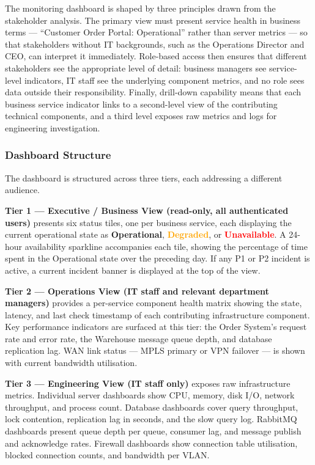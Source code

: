 The monitoring dashboard is shaped by three principles drawn from the stakeholder analysis. The primary view must present service health in business terms --- ``Customer Order Portal: Operational'' rather than server metrics --- so that stakeholders without IT backgrounds, such as the Operations Director and CEO, can interpret it immediately. Role-based access then ensures that different stakeholders see the appropriate level of detail: business managers see service-level indicators, IT staff see the underlying component metrics, and no role sees data outside their responsibility. Finally, drill-down capability means that each business service indicator links to a second-level view of the contributing technical components, and a third level exposes raw metrics and logs for engineering investigation.

\subsubsection{Dashboard Structure}

The dashboard is structured across three tiers, each addressing a different audience.

\textbf{Tier 1 --- Executive / Business View (read-only, all authenticated users)} presents six status tiles, one per business service, each displaying the current operational state as \textcolor{green!60!black}{\textbf{Operational}}, \textcolor{orange}{\textbf{Degraded}}, or \textcolor{red}{\textbf{Unavailable}}. A 24-hour availability sparkline accompanies each tile, showing the percentage of time spent in the Operational state over the preceding day. If any P1 or P2 incident is active, a current incident banner is displayed at the top of the view.

\textbf{Tier 2 --- Operations View (IT staff and relevant department managers)} provides a per-service component health matrix showing the state, latency, and last check timestamp of each contributing infrastructure component. Key performance indicators are surfaced at this tier: the Order System's request rate and error rate, the Warehouse message queue depth, and database replication lag. WAN link status --- MPLS primary or VPN failover --- is shown with current bandwidth utilisation.

\textbf{Tier 3 --- Engineering View (IT staff only)} exposes raw infrastructure metrics. Individual server dashboards show CPU, memory, disk I/O, network throughput, and process count. Database dashboards cover query throughput, lock contention, replication lag in seconds, and the slow query log. RabbitMQ dashboards present queue depth per queue, consumer lag, and message publish and acknowledge rates. Firewall dashboards show connection table utilisation, blocked connection counts, and bandwidth per VLAN.


